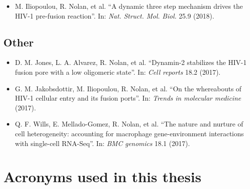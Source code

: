 \documentclass[12pt,]{book}
\providecommand{\tightlist}{%
  \setlength{\itemsep}{0pt}\setlength{\parskip}{0pt}}
\theoremstyle{definition}
\theoremstyle{definition}
\theoremstyle{definition}
\theoremstyle{remark}
\begin{document}
\begin{itemize}
\tightlist
\item
  M. Iliopoulou, R. Nolan, et al. ``A dynamic three step mechanism
  drives the HIV-1 pre-fusion reaction''. In: \emph{Nat. Struct. Mol.
  Biol.} 25.9 (2018).
\end{itemize}

\subsection*{Other}\label{other}

\begin{itemize}
\tightlist
\item
  D. M. Jones, L. A. Alvarez, R. Nolan, et al. ``Dynamin-2 stabilizes
  the HIV-1 fusion pore with a low oligomeric state''. In: \emph{Cell
  reports} 18.2 (2017).
\item
  G. M. Jakobsdottir, M. Iliopoulou, R. Nolan, et al. ``On the
  whereabouts of HIV-1 cellular entry and its fusion ports''. In:
  \emph{Trends in molecular medicine} (2017).
\item
  Q. F. Wills, E. Mellado-Gomez, R. Nolan, et al. ``The nature and
  nurture of cell heterogeneity: accounting for macrophage
  gene-environment interactions with single-cell RNA-Seq''. In:
  \emph{BMC genomics} 18.1 (2017).
\end{itemize}

\section*{Acronyms used in this
thesis}\label{acronyms-used-in-this-thesis}
\end{document}
